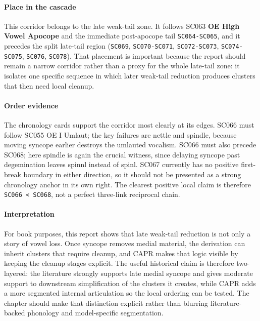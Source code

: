 \documentclass[
  british,
  a4paper,
]{article}
\begin{document}
\paragraph{Place in the cascade}\label{place-in-the-cascade-42}

This corridor belongs to the late weak-tail zone. It follows SC063
\textbf{OE High Vowel Apocope} and the immediate post-apocope tail
\texttt{SC064-SC065}, and it precedes the split late-tail region
(\texttt{SC069}, \texttt{SC070-SC071}, \texttt{SC072-SC073},
\texttt{SC074-SC075}, \texttt{SC076}, \texttt{SC078}). That placement is
important because the report should remain a narrow corridor rather than
a proxy for the whole late-tail zone: it isolates one specific sequence
in which later weak-tail reduction produces clusters that then need
local cleanup.

\paragraph{Order evidence}\label{order-evidence-42}

The chronology cards support the corridor most clearly at its edges.
SC066 must follow SC055 OE I Umlaut; the key failures are nettle and
spindle, because moving syncope earlier destroys the umlauted vocalism.
SC066 must also precede SC068; here spindle is again the crucial
witness, since delaying syncope past degemination leaves spinnl instead
of spinl. SC067 currently has no positive first-break boundary in either
direction, so it should not be presented as a strong chronology anchor
in its own right. The clearest positive local claim is therefore
\texttt{SC066\ \textless{}\ SC068}, not a perfect three-link reciprocal
chain.

\paragraph{Interpretation}\label{interpretation-42}

For book purposes, this report shows that late weak-tail reduction is
not only a story of vowel loss. Once syncope removes medial material,
the derivation can inherit clusters that require cleanup, and CAPR makes
that logic visible by keeping the cleanup stages explicit. The useful
historical claim is therefore two-layered: the literature strongly
supports late medial syncope and gives moderate support to downstream
simplification of the clusters it creates, while CAPR adds a more
segmented internal articulation so the local ordering can be tested. The
chapter should make that distinction explicit rather than blurring
literature-backed phonology and model-specific segmentation.
\end{document}
